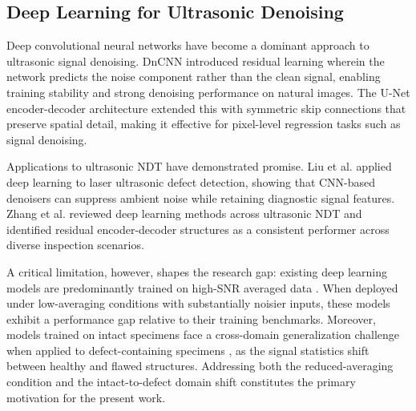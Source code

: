 \subsection{Deep Learning for Ultrasonic Denoising}
\label{sec:deep-learning}

Deep convolutional neural networks have become a dominant approach to ultrasonic signal denoising. DnCNN \cite{zhang2017denoising} introduced residual learning wherein the network predicts the noise component rather than the clean signal, enabling training stability and strong denoising performance on natural images. The U-Net encoder-decoder architecture \cite{ronneberger2015unet} extended this with symmetric skip connections that preserve spatial detail, making it effective for pixel-level regression tasks such as signal denoising.

Applications to ultrasonic NDT have demonstrated promise. Liu et al. \cite{liu2022deep} applied deep learning to laser ultrasonic defect detection, showing that CNN-based denoisers can suppress ambient noise while retaining diagnostic signal features. Zhang et al. \cite{zhang2020deep} reviewed deep learning methods across ultrasonic NDT and identified residual encoder-decoder structures as a consistent performer across diverse inspection scenarios.

A critical limitation, however, shapes the research gap: existing deep learning models are predominantly trained on high-SNR averaged data \cite{liu2022deep, zhang2020deep}. When deployed under low-averaging conditions with substantially noisier inputs, these models exhibit a performance gap relative to their training benchmarks. Moreover, models trained on intact specimens face a cross-domain generalization challenge when applied to defect-containing specimens \cite{liu2022deep}, as the signal statistics shift between healthy and flawed structures. Addressing both the reduced-averaging condition and the intact-to-defect domain shift constitutes the primary motivation for the present work.